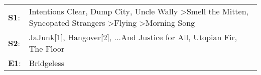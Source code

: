 \begin{supertabular}{p{0.03\textwidth}p{0.92\textwidth}}
 \textbf{S1}:  &  Intentions Clear\textsuperscript{}, \enspace Dump City\textsuperscript{}, \enspace Uncle Wally\textsuperscript{} \textgreater \enspace Smell the Mitten\textsuperscript{}, \enspace Syncopated Strangers\textsuperscript{} \textgreater \enspace Flying\textsuperscript{} \textgreater \enspace Morning Song\textsuperscript{}  \enspace  \\
 \textbf{S2}:  &                                                                                                                            JaJunk[1]\textsuperscript{}, \enspace Hangover[2]\textsuperscript{}, \enspace ...And Justice for All\textsuperscript{}, \enspace Utopian Fir\textsuperscript{}, \enspace The Floor\textsuperscript{}  \enspace  \\
 \textbf{E1}:  &                                                                                                                                                                                                                                                                                                    Bridgeless\textsuperscript{}  \enspace  \\
\end{supertabular}
